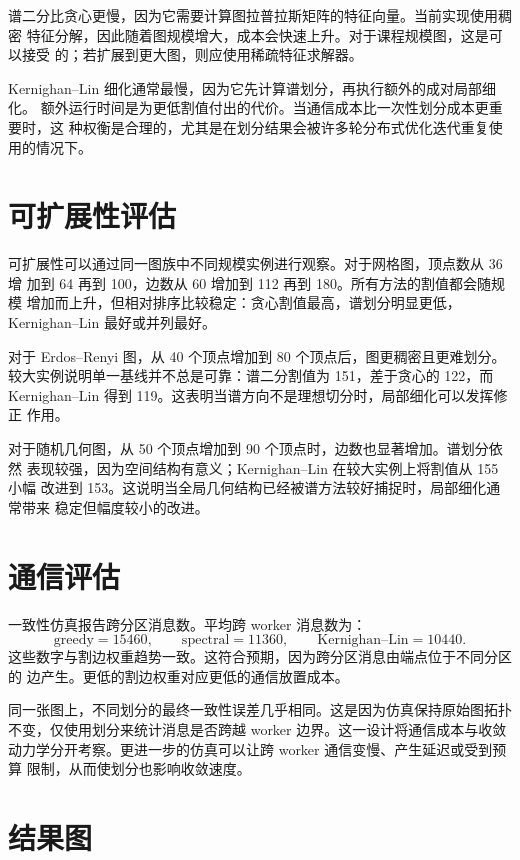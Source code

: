 \documentclass[UTF8, 11pt]{ctexart}
\begin{document}
谱二分比贪心更慢，因为它需要计算图拉普拉斯矩阵的特征向量。当前实现使用稠密
特征分解，因此随着图规模增大，成本会快速上升。对于课程规模图，这是可以接受
的；若扩展到更大图，则应使用稀疏特征求解器。

Kernighan--Lin 细化通常最慢，因为它先计算谱划分，再执行额外的成对局部细化。
额外运行时间是为更低割值付出的代价。当通信成本比一次性划分成本更重要时，这
种权衡是合理的，尤其是在划分结果会被许多轮分布式优化迭代重复使用的情况下。

\section{可扩展性评估}

可扩展性可以通过同一图族中不同规模实例进行观察。对于网格图，顶点数从 36 增
加到 64 再到 100，边数从 60 增加到 112 再到 180。所有方法的割值都会随规模
增加而上升，但相对排序比较稳定：贪心割值最高，谱划分明显更低，
Kernighan--Lin 最好或并列最好。

对于 Erdos--Renyi 图，从 40 个顶点增加到 80 个顶点后，图更稠密且更难划分。
较大实例说明单一基线并不总是可靠：谱二分割值为 151，差于贪心的 122，而
Kernighan--Lin 得到 119。这表明当谱方向不是理想切分时，局部细化可以发挥修正
作用。

对于随机几何图，从 50 个顶点增加到 90 个顶点时，边数也显著增加。谱划分依然
表现较强，因为空间结构有意义；Kernighan--Lin 在较大实例上将割值从 155 小幅
改进到 153。这说明当全局几何结构已经被谱方法较好捕捉时，局部细化通常带来
稳定但幅度较小的改进。

\section{通信评估}

一致性仿真报告跨分区消息数。平均跨 worker 消息数为：
\[
    \text{greedy}=15460,\qquad
    \text{spectral}=11360,\qquad
    \text{Kernighan--Lin}=10440.
\]
这些数字与割边权重趋势一致。这符合预期，因为跨分区消息由端点位于不同分区的
边产生。更低的割边权重对应更低的通信放置成本。

同一张图上，不同划分的最终一致性误差几乎相同。这是因为仿真保持原始图拓扑
不变，仅使用划分来统计消息是否跨越 worker 边界。这一设计将通信成本与收敛
动力学分开考察。更进一步的仿真可以让跨 worker 通信变慢、产生延迟或受到预算
限制，从而使划分也影响收敛速度。

\section{结果图}
\end{document}
